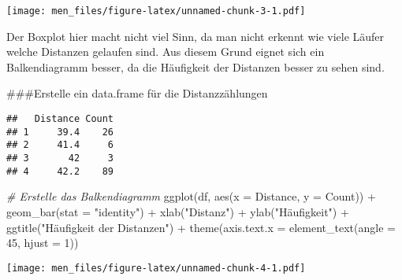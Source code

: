 \documentclass[
]{article}
\newenvironment{Shaded}{\begin{snugshade}}{\end{snugshade}}
\newcommand{\AttributeTok}[1]{\textcolor[rgb]{0.77,0.63,0.00}{#1}}
\newcommand{\CommentTok}[1]{\textcolor[rgb]{0.56,0.35,0.01}{\textit{#1}}}
\newcommand{\DecValTok}[1]{\textcolor[rgb]{0.00,0.00,0.81}{#1}}
\newcommand{\FunctionTok}[1]{\textcolor[rgb]{0.00,0.00,0.00}{#1}}
\newcommand{\NormalTok}[1]{#1}
\newcommand{\OtherTok}[1]{\textcolor[rgb]{0.56,0.35,0.01}{#1}}
\newcommand{\SpecialCharTok}[1]{\textcolor[rgb]{0.00,0.00,0.00}{#1}}
\newcommand{\StringTok}[1]{\textcolor[rgb]{0.31,0.60,0.02}{#1}}
\begin{document}
\texttt{[image: men\_files/figure-latex/unnamed-chunk-3-1.pdf]}

Der Boxplot hier macht nicht viel Sinn, da man nicht erkennt wie viele
Läufer welche Distanzen gelaufen sind. Aus diesem Grund eignet sich ein
Balkendiagramm besser, da die Häufigkeit der Distanzen besser zu sehen
sind.

\#\#\#Erstelle ein data.frame für die Distanzzählungen

\begin{Shaded}
\end{Shaded}

\begin{verbatim}
##   Distance Count
## 1     39.4    26
## 2     41.4     6
## 3       42     3
## 4     42.2    89
\end{verbatim}

\begin{Shaded}
\begin{Highlighting}[]
\CommentTok{\# Erstelle das Balkendiagramm}
\FunctionTok{ggplot}\NormalTok{(df, }\FunctionTok{aes}\NormalTok{(}\AttributeTok{x =}\NormalTok{ Distance, }\AttributeTok{y =}\NormalTok{ Count)) }\SpecialCharTok{+}
  \FunctionTok{geom\_bar}\NormalTok{(}\AttributeTok{stat =} \StringTok{"identity"}\NormalTok{) }\SpecialCharTok{+}
  \FunctionTok{xlab}\NormalTok{(}\StringTok{"Distanz"}\NormalTok{) }\SpecialCharTok{+}
  \FunctionTok{ylab}\NormalTok{(}\StringTok{"Häufigkeit"}\NormalTok{) }\SpecialCharTok{+}
  \FunctionTok{ggtitle}\NormalTok{(}\StringTok{"Häufigkeit der Distanzen"}\NormalTok{) }\SpecialCharTok{+}
  \FunctionTok{theme}\NormalTok{(}\AttributeTok{axis.text.x =} \FunctionTok{element\_text}\NormalTok{(}\AttributeTok{angle =} \DecValTok{45}\NormalTok{, }\AttributeTok{hjust =} \DecValTok{1}\NormalTok{))}
\end{Highlighting}
\end{Shaded}

\texttt{[image: men\_files/figure-latex/unnamed-chunk-4-1.pdf]}
\end{document}
